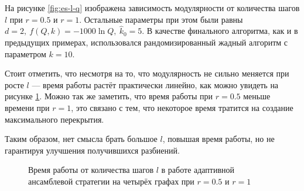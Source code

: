 На рисунке \ref{fig:es-l-q} изображена зависимость модулярности от количества шагов $l$ при $r = 0.5$ и $r = 1$. Остальные параметры при этом были равны $d = 2,\ f(Q, k) = -1000 \ln Q,\ \hat{k}_0 = 5$. В качестве финального алгоритма, как и в предыдущих примерах, использовался рандомизированный жадный алгоритм с параметром $k = 10$.

Стоит отметить, что несмотря на то, что модулярность не сильно меняется при росте $l$ --- время работы растёт практически линейно, как можно увидеть на рисунке \ref{fig:es-l-t}. Можно так же заметить, что время работы при $r = 0.5$ меньше времени при $r = 1$, это связано с тем, что некоторое время тратится на создание максимального перекрытия.

Таким образом, нет смысла брать большое $l$, повышая время работы, но не гарантируя улучшения получившихся разбиений.

\begin{figure}[H]
	\caption{Время работы от количества шагов $l$ в работе адаптивной ансамблевой стратегии на четырёх графах при $r = 0.5$ и $r = 1$}
	\label{fig:es-l-t}
\end{figure}

